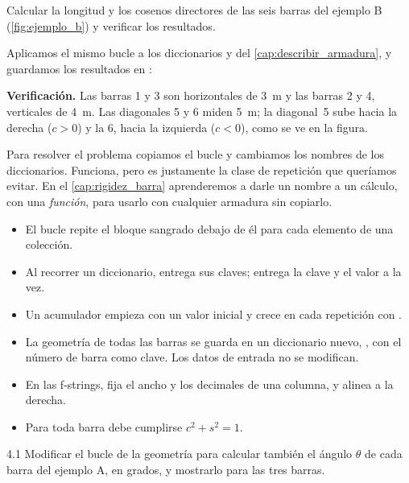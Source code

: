 \begin{problemaresuelto}
Calcular la longitud y los cosenos directores de las seis barras del ejemplo
B (\cref{fig:ejemplo_b}) y verificar los resultados.

\solucion
Aplicamos el mismo bucle a los diccionarios  y  del
\cref{cap:describir_armadura}, y guardamos los resultados en
:

\textbf{Verificación.} Las barras 1 y 3 son horizontales de \SI{3}{\metre} y
las barras 2 y 4, verticales de \SI{4}{\metre}. Las diagonales 5 y 6 miden
\SI{5}{\metre}; la diagonal~5 sube hacia la derecha ($c > 0$) y la 6, hacia la
izquierda ($c < 0$), como se ve en la figura.
\end{problemaresuelto}

Para resolver el problema copiamos el bucle y cambiamos los nombres de los
diccionarios. Funciona, pero es justamente la clase de repetición que
queríamos evitar. En el \cref{cap:rigidez_barra} aprenderemos a darle un
nombre a un cálculo, con una \emph{función}, para usarlo con cualquier
armadura sin copiarlo.

\repasoyresumen

\begin{itemize}
  \item El bucle  repite el bloque sangrado debajo de él para cada
    elemento de una colección.
  \item Al recorrer un diccionario,  entrega sus claves;
     entrega la clave y el valor a la vez.
  \item Un acumulador empieza con un valor inicial y crece en cada repetición
    con \py{+=}.
  \item La geometría de todas las barras se guarda en un diccionario nuevo,
    , con el número de barra como clave. Los datos de entrada no
    se modifican.
  \item En las f-strings,  fija el ancho y los decimales de una
    columna, y  alinea a la derecha.
  \item Para toda barra debe cumplirse $c^2 + s^2 = 1$.
\end{itemize}

\ejercicios

\begin{ejercicio}{4.1}
Modificar el bucle de la geometría para calcular también el ángulo $\theta$
de cada barra del ejemplo A, en grados, y mostrarlo para las tres barras.
\end{ejercicio}

